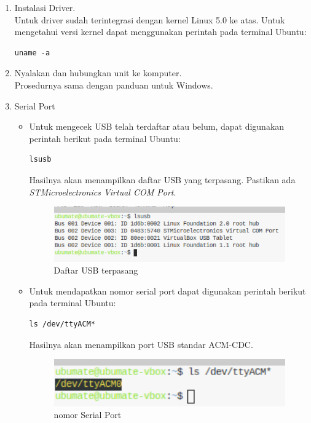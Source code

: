 \documentclass[12pt,]{article}
\begin{document}
	\begin{enumerate}
		\item Instalasi Driver.\\
		Untuk driver sudah terintegrasi dengan kernel Linux 5.0 ke atas.
		Untuk mengetahui versi kernel dapat menggunakan perintah pada terminal Ubuntu:
		\begin{verbatim}
uname -a
		\end{verbatim}
		
		\item Nyalakan dan hubungkan unit ke komputer.\\
		Prosedurnya sama dengan panduan untuk Windows.
		
		\item Serial Port
		\begin{itemize}
			\item Untuk mengecek USB telah terdaftar atau belum,
			dapat digunakan perintah berikut pada terminal Ubuntu:
			\begin{verbatim}
lsusb
			\end{verbatim}
			Hasilnya akan menampilkan daftar USB yang terpasang.
			Pastikan ada \textit{STMicroelectronics Virtual COM Port}.
			\begin{figure}[!ht]
				\centering
				\includegraphics[width=300pt]{images/terminal/ubu_usbport}
				\caption{Daftar USB terpasang}
			\end{figure}
			
			\newpage
			\item Untuk mendapatkan nomor serial port
			dapat digunakan perintah berikut pada terminal Ubuntu:
			\begin{verbatim}
ls /dev/ttyACM*
			\end{verbatim}
			Hasilnya akan menampilkan port USB standar ACM-CDC.
			\begin{figure}[!ht]
				\centering
				\includegraphics[width=300pt]{images/terminal/ubu_acmport}
				\caption{nomor Serial Port}
			\end{figure}
		\end{itemize}
		
		
	\end{enumerate}
	
	
\end{document}

